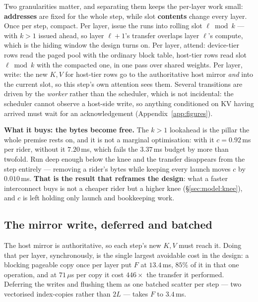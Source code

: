 

Two granularities matter, and separating them keeps the per-layer work small:
\textbf{addresses} are fixed for the whole step, while slot \textbf{contents} change
every layer. Once per step, compact. Per layer, issue the runs into rolling slot
$\ell \bmod k$ --- with $k>1$ issued ahead, so layer $\ell{+}1$'s transfer overlaps
layer $\ell$'s compute, which is the hiding window the design turns on. Per layer,
attend: device-tier rows read the paged pool with the ordinary block table,
host-tier rows read slot $\ell \bmod k$ with the compacted one, in one pass over
shared weights. Per layer, write: the new $K,V$ for host-tier rows go to the
authoritative host mirror \emph{and} into the current slot, so this step's own
attention sees them. Several transitions are driven by the \emph{worker} rather than
the scheduler, which is not incidental: the scheduler cannot observe a host-side
write, so anything conditioned on KV having arrived must wait for an acknowledgement
(Appendix~\ref{app:figures}).

\textbf{What it buys: the bytes become free.} The $k>1$ lookahead is the pillar the
whole premise rests on, and it is not a marginal optimisation: with it $c = 0.92$\,ms
per rider, without it $7.20$\,ms, which fails the $3.37$\,ms budget by more than
twofold. Run deep enough below the knee and the transfer disappears from the step
entirely --- removing a rider's bytes while keeping every launch moves $c$ by
$0.010$\,ms. \textbf{That is the result that reframes the design}: what a faster
interconnect buys is not a cheaper rider but a higher knee
(\S\ref{sec:model:knee}), and $c$ is left holding only launch and bookkeeping work.

\subsection{The mirror write, deferred and batched}
\label{sec:design:mirror}

The host mirror is authoritative, so each step's new $K,V$ must reach it. Doing
that per layer, synchronously, is the single largest avoidable cost in the design:
a blocking pageable copy once per layer put $F$ at $13.4$\,ms, $85\%$ of it in that
one operation, and at $71\,\mu$s per copy it cost $446\times$ the transfer it
performed. Deferring the writes and flushing them as one batched scatter per step
--- two vectorised index-copies rather than $2L$ --- takes $F$ to $3.4$\,ms.

